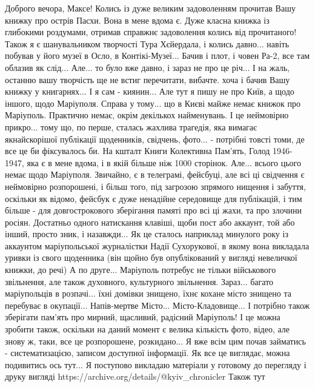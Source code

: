 
Доброго вечора, Максе! Колись із дуже великим задоволенням прочитав Вашу книжку
про острів Пасхи. Вона в мене вдома є. Дуже класна книжка із глибокими
роздумами, отримав справжнє задоволення колись від прочитаного! Також я є
шанувальником творчості Тура Хєйердала, і колись давно... навіть побував у його
музеї в Осло, в Контікі-Музеї... Бачив і плот, і човен Ра-2, все там облазив як
слід...  Але... то було вже давно, і зараз не про це річ... І на жаль, останню
вашу творчість ще не встиг перечитати, вибачте. хоча і бачив Вашу книжку у
книгарнях... І я сам - киянин... Але тут я пишу не про Київ, а щодо іншого,
щодо Маріуполя. Справа у тому... що в Києві майже немає книжок про Маріуполь.
Практично немає, окрім декількох найменувань. І це неймовірно прикро... тому
що, по перше, сталась жахлива трагедія, яка вимагає якнайскорішої публікації
щоденників, свідчень, фото... - потрібні товсті томи, де все це би фіксувалось
би. На кшталт Книги Колективна Пам'ять, Голод 1946-1947, яка є в мене вдома, і
в якій більше ніж 1000 сторінок.  Але... всього цього немає щодо Маріуполя.
Звичайно, є в телеграмі, фейсбуці, але всі ці свідчення є неймовірно
розпорошені, і більш того, під загрозою зпрямого нищення і забуття, оскільки як
відомо, фейсбук є дуже ненадійне середовище для публікацій, і тим більше - для
довгострокового зберігання памяті про всі ці жахи, та про злочини росіян.
Достатньо одного натискання клавіші, щоби пост або аккаунт, той або інший,
просто зник, і назавжди... Як це сталось наприклад минулого року із аккаунтом
маріупольської журналістки Надії Сухорукової, в якому вона викладала уривки із
свого щоденника (він щойно був опублікований у вигляді невеличкої книжки, до
речі) А по друге... Маріуполь потребує не тільки військового звільнення, але
також духовного, культурного звільнення. Зараз... багато маріупольців в
розпачі... їхні домівки знищено, їхнє кохане місто знищено та перебуває в
окупації... Напів-мертве Місто... Місто-Кладовище... І потрібно також зберігати
пам'ять про мирний, щасливий, радісний Маріуполь! І це можна зробити також,
оскільки на даний момент є велика кількість фото, відео, але знову ж, таки, все
це розпорошене, розкидано... Я вже всім цим почав займатись - систематизацією,
записом доступної інформації. Як все це виглядає, можна подивитись ось тут... Я
поступово викладаю матеріали у готовому до перегляду і друку вигляді
https://archive.org/details/@kyiv_chronicler  Також тут
